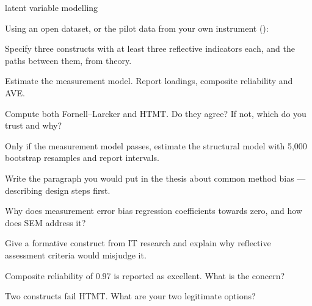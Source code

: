 \begin{traditions}{latent variable modelling}
\end{traditions}

\begin{lab}
Using an open dataset, or the pilot data from your own instrument
():

\begin{tightnum}
  \item Specify three constructs with at least three reflective indicators
    each, and the paths between them, from theory.
  \item Estimate the measurement model. Report loadings, composite reliability
    and AVE.
  \item Compute both Fornell--Larcker and HTMT. Do they agree? If not, which do
    you trust and why?
  \item Only if the measurement model passes, estimate the structural model
    with 5,000 bootstrap resamples and report intervals.
  \item Write the paragraph you would put in the thesis about common method
    bias --- describing design steps first.
\end{tightnum}
\end{lab}

\begin{checkpoint}
\begin{tightnum}
  \item Why does measurement error bias regression coefficients towards zero,
    and how does SEM address it?
  \item Give a formative construct from IT research and explain why reflective
    assessment criteria would misjudge it.
  \item Composite reliability of 0.97 is reported as excellent. What is the
    concern?
  \item Two constructs fail HTMT. What are your two legitimate options?
\end{tightnum}
\end{checkpoint}

